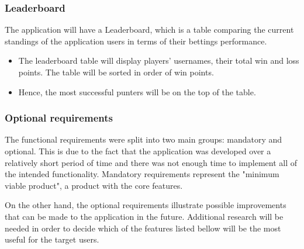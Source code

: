 \subsubsection{Leaderboard}
\label{subsubsec:leaderboard_req}
The application will have a Leaderboard, which is a table comparing the current standings of the application users in terms of their bettings performance.
\begin{itemize}
    \item The leaderboard table will display players' usernames, their total win and loss points. The table will be sorted in order of win points.     
	 \item Hence, the most successful punters will be on the top of the table.
\end{itemize}

\subsubsection{Optional requirements}
\label{sec:optional_req}
The functional requirements were split into two main groups: mandatory and optional. This is due to the fact that the application was developed over a relatively short period of time and there was not enough time to implement all of the intended functionality. Mandatory requirements represent the "minimum viable product", a product with the core features. 

On the other hand, the optional requirements illustrate possible improvements that can be made to the application in the future. Additional research will be needed in order to decide which of the features listed bellow will be the most useful for the target users.

